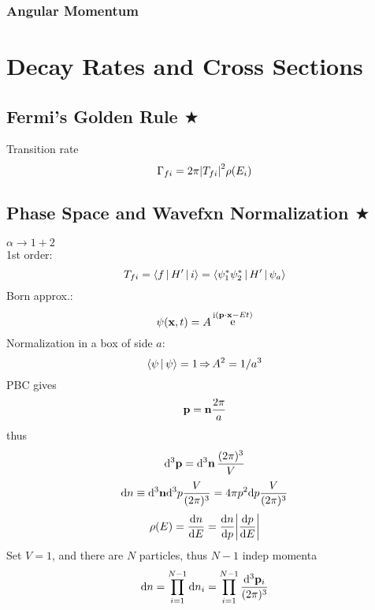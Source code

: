 \documentclass[a4paper]{article}
\DeclareMathOperator{\e}{\mathrm{e}}
\DeclareMathOperator{\I}{\mathrm{i}}
\DeclareMathOperator{\ra}{\rightarrow}
\DeclareMathOperator{\dra}{\Rightarrow}
\numberwithin{equation}{section}
\begin{document}
\subsubsection{Angular Momentum}

\section{Decay Rates and Cross Sections}

\subsection{Fermi's Golden Rule $ \bigstar $}
Transition rate
\begin{equation}\label{key}
\Gamma_{fi} = 2\pi \abs{T_{fi}}^2\rho(E_i)
\end{equation}

\subsection{Phase Space and Wavefxn Normalization $ \bigstar $}
$ \alpha \ra 1 + 2 $ \\

1st order:
\begin{equation}\label{key}
T_{fi} = \Braket{f | H' | i} = \Braket{\psi_1^*\psi_2^* | H' | \psi_a}
\end{equation}
Born approx.:
\begin{equation}\label{key}
\psi(\vb{x}, t) = A\e^{\I(\vb{p}\cdot\vb{x} - Et)}
\end{equation}
Normalization in a box of side $ a $:
\begin{equation}\label{key}
\Braket{\psi | \psi} = 1 \dra A^2 = 1/a^3
\end{equation}
PBC gives
\begin{equation}\label{key}
\vb{p} = \vb{n}\dfrac{2\pi}{a}
\end{equation}
thus
\begin{equation}\label{key}
\dd[3]{\vb{p}} = \dd[3]{\vb{n}}\dfrac{(2\pi)^3}{V}
\end{equation}
\begin{equation}\label{key}
\dd n \equiv \dd[3]\vb{n} \dd[3] p \dfrac{V}{(2\pi)^3} = 4\pi p^2\dd p \dfrac{V}{(2\pi)^3}
\end{equation}
\begin{equation}\label{key}
\rho(E) = \dv{n}{E} = \dv{n}{p}\abs{\dv{p}{E}}
\end{equation}
Set $ V = 1 $, and there are $ N $ particles, thus $ N - 1 $ indep momenta
\begin{equation}\label{key}
\dd n = \prod_{i=1}^{N-1}\dd n_i = \prod_{i=1}^{N-1} \dfrac{\dd[3]\vb{p}_i}{(2\pi)^3}
\end{equation}
\begin{equation}\label{key}
~
\end{equation}
\end{document}
